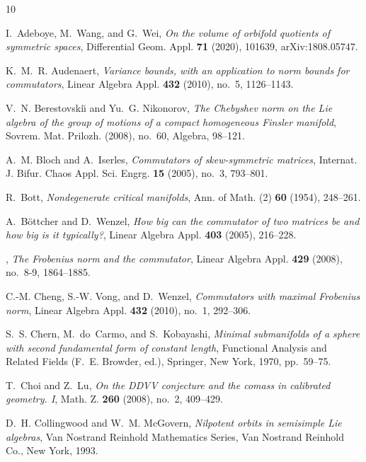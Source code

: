 \begin{thebibliography}{10}

I.~Adeboye, M.~Wang, and G.~Wei, \emph{On the volume of orbifold quotients of
  symmetric spaces}, Differential Geom. Appl. \textbf{71} (2020), 101639,
  arXiv:1808.05747.

K.~M.~R. Audenaert, \emph{Variance bounds, with an application to norm bounds
  for commutators}, Linear Algebra Appl. \textbf{432} (2010), no.~5,
  1126--1143.

V.~N. Berestovski{\u\i} and Yu.~G. Nikonorov, \emph{The {C}hebyshev norm on the
  {L}ie algebra of the group of motions of a compact homogeneous {F}insler
  manifold}, Sovrem. Mat. Prilozh. (2008), no.~60, Algebra, 98--121.

A.~M. Bloch and A.~Iserles, \emph{Commutators of skew-symmetric matrices},
  Internat. J. Bifur. Chaos Appl. Sci. Engrg. \textbf{15} (2005), no.~3,
  793--801.

R.~Bott, \emph{Nondegenerate critical manifolds}, Ann. of Math. (2) \textbf{60}
  (1954), 248--261.

A.~B{\"o}ttcher and D.~Wenzel, \emph{How big can the commutator of two matrices
  be and how big is it typically?}, Linear Algebra Appl. \textbf{403} (2005),
  216--228.

\bysame, \emph{The {F}robenius norm and the commutator}, Linear Algebra Appl.
  \textbf{429} (2008), no.~8-9, 1864--1885.

C.-M. Cheng, S.-W. Vong, and D.~Wenzel, \emph{Commutators with maximal
  {F}robenius norm}, Linear Algebra Appl. \textbf{432} (2010), no.~1, 292--306.

S.~S. Chern, M.~do~Carmo, and S.~Kobayashi, \emph{Minimal submanifolds of a
  sphere with second fundamental form of constant length}, Functional
  {A}nalysis and {R}elated {F}ields (F.~E. Browder, ed.), Springer, New York,
  1970, pp.~59--75.

T.~Choi and Z.~Lu, \emph{On the {DDVV} conjecture and the comass in calibrated
  geometry. {I}}, Math. Z. \textbf{260} (2008), no.~2, 409--429.

D.~H. Collingwood and W.~M. McGovern, \emph{Nilpotent orbits in semisimple
  {L}ie algebras}, Van Nostrand Reinhold Mathematics Series, Van Nostrand
  Reinhold Co., New York, 1993.


\end{thebibliography}
